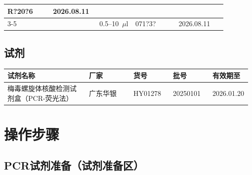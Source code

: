 \documentclass[UTF8,10pt,a4paper,fontset=fandol]{ctexart}
\newcommand{\fieldvalue}[1]{#1}
\newcommand{\handwritten}[1]{#1}
\begin{document}
\begin{center}
\begin{tabular}{|p{0.19\linewidth}|p{0.16\linewidth}|p{0.15\linewidth}|p{0.18\linewidth}|p{0.20\linewidth}|}
\fieldvalue{\handwritten{R?20?6}} &
\fieldvalue{\handwritten{2026.08.11}} \\
\cline{3-5}
& &
\fieldvalue{\handwritten{0.5--10~$\mu$l}} &
\fieldvalue{\handwritten{071?3?}} &
\fieldvalue{\handwritten{2026.08.11}} \\
\hline
\end{tabular}
\end{center}

\subsection{试剂}

\begin{center}
\begin{tabular}{|p{0.33\linewidth}|p{0.18\linewidth}|p{0.16\linewidth}|p{0.16\linewidth}|p{0.15\linewidth}|}
\hline
试剂名称 & 厂家 & 货号 & 批号 & 有效期至 \\
\hline
梅毒螺旋体核酸检测试剂盒（PCR-荧光法） &
广东华银 & HY01278 &
\fieldvalue{\handwritten{20250101}} &
\fieldvalue{\handwritten{2026.01.20}} \\
\hline
\end{tabular}
\end{center}

\section{操作步骤}

\subsection{PCR试剂准备（试剂准备区）}
\end{document}
